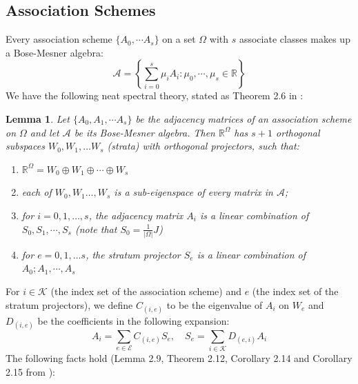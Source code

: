 \documentclass{article}
\theoremstyle{plain}
\newtheorem{lemma}{Lemma}[section]
\numberwithin{equation}{section}
\theoremstyle{definition}
\theoremstyle{remark}
\begin{document}
\subsection{Association Schemes}
\label{appendix:association_schemes}
Every association scheme $\{A_0, \cdots A_s\}$ on a set $\Omega$ with $s$ associate classes makes up a Bose-Mesner algebra:
$$\mathcal{A} = \left\{\sum_{i=0}^s \mu_i A_i: \mu_0, \cdots, \mu_s\in \mathbb{R}\right\}$$
We have the following neat spectral theory, stated as Theorem 2.6 in \cite{rabailey}:
\begin{lemmaproofbox}
    \begin{lemma}\label{lemma:2.6}
        Let $\{A_0, A_1, \cdots A_s\}$ be the adjacency matrices of an association scheme on $\Omega$ and let $\mathcal{A}$ be its Bose-Mesner algebra. Then $\mathbb{R}^\Omega$ has $s+1$ orthogonal subspaces $W_0, W_1, \dots W_s$ (strata) with orthogonal projectors, such that: 
        \begin{enumerate}[label=(\roman*)]
            \item $\mathbb{R}^\Omega = W_0\oplus W_1\oplus \cdots \oplus W_s$
            \item each of $W_0, W_1\dots, W_s$ is a sub-eigenspace of every matrix in $\mathcal{A}$;
            \item for $i=0, 1, \dots, s$, the adjacency matrix $A_i$ is a linear combination of $S_0, S_1, \cdots, S_s$ (note that $S_0 = \frac{1}{|\Omega|}J$)
            \item for $e=0, 1, \dots s$, the stratum projector $S_e$ is a linear combination of $A_0;  A_1, \cdots, A_s$
        \end{enumerate}
    \end{lemma}
\end{lemmaproofbox}
For $i\in \mathcal{K}$ (the index set of the association scheme) and $e$ (the index set of the stratum projectors), we define $C_{(i, e)}$ to be the eigenvalue of $A_i$ on $W_e$ and $D_{(i, e)}$ be the coefficients in the following expansion: $$A_i = \sum_{e\in\mathcal{E}}C_{(i, e)}S_e, \quad S_e = \sum_{i\in \mathcal{K}} D_{(e, i)} A_i$$
The following facts hold (Lemma 2.9, Theorem 2.12, Corollary 2.14 and Corollary 2.15 from \cite{rabailey}):
\end{document}
